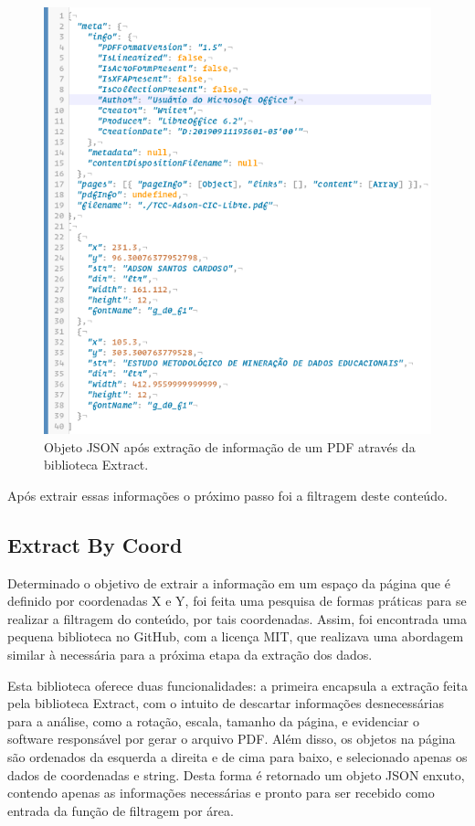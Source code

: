 \begin{figure}[H]
\centering
\captionsetup{justification   = raggedright,
              singlelinecheck = false}
\caption{Objeto JSON após extração de informação de um PDF através da biblioteca Extract.}\label{pdfExtract}
\includegraphics[scale=0.5]{figs/pdfExtract.png}
\end{figure}

Após extrair essas informações o próximo passo foi a filtragem deste conteúdo.

\subsection{Extract By Coord}

Determinado o objetivo de extrair a informação em um espaço da página que é definido por coordenadas X e Y, foi feita uma pesquisa de formas práticas para se realizar a filtragem do conteúdo, por tais coordenadas. Assim, foi encontrada uma pequena biblioteca no GitHub, com a licença MIT, que realizava uma abordagem similar à necessária para a próxima etapa da extração dos dados.

Esta biblioteca oferece duas funcionalidades: a primeira encapsula a extração feita pela biblioteca Extract, com o intuito de descartar informações desnecessárias para a análise, como a rotação, escala, tamanho da página, e evidenciar o software responsável por gerar o arquivo PDF. Além disso, os objetos na página são ordenados da esquerda a direita e de cima para baixo, e selecionado apenas os dados de coordenadas e string. Desta forma é retornado um objeto JSON enxuto, contendo apenas as informações necessárias e pronto para ser recebido como entrada da função de filtragem por área. 

